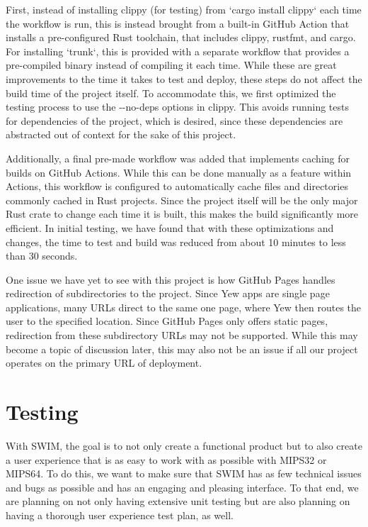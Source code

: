 \documentclass[
    paper=letter,
    parskip=half,
    fontsize=12pt,
    titlepage=firstiscover,
    toc=bibliography,
    numbers=endperiod
]{scrartcl}
\let\oldsection\section
\renewcommand{\section}{\newpage\oldsection}
\begin{document}
First, instead of installing clippy (for testing) from `cargo install
clippy` each time the workflow is run, this is instead brought from a
built-in GitHub Action \cite{ga-rust-toolchain} that installs a pre-configured Rust toolchain,
that includes clippy, rustfmt, and cargo. For installing `trunk`, this
is provided with a separate workflow \cite{ga-trunk} that provides a pre-compiled binary
instead of compiling it each time. While these are great improvements to
the time it takes to test and deploy, these steps do not affect the
build time of the project itself. To accommodate this, we first
optimized the testing process to use the -\/-no-deps options in clippy.
This avoids running tests for dependencies of the project, which is
desired, since these dependencies are abstracted out of context for the
sake of this project.

Additionally, a final pre-made workflow \cite{ga-rust-cache} was added that implements
caching for builds on GitHub Actions. While this can be done manually as
a feature within Actions, this workflow is configured to automatically
cache files and directories commonly cached in Rust projects. Since the
project itself will be the only major Rust crate to change each time it
is built, this makes the build significantly more efficient. In initial
testing, we have found that with these optimizations and changes, the
time to test and build was reduced from about 10 minutes to less than 30
seconds.

One issue we have yet to see with this project is how GitHub Pages
handles redirection of subdirectories to the project. Since Yew apps are
single page applications, many URLs direct to the same one page, where
Yew then routes the user to the specified location. Since GitHub Pages
only offers static pages, redirection from these subdirectory URLs may
not be supported. While this may become a topic of discussion later,
this may also not be an issue if all our project operates on the primary
URL of deployment.


\section{Testing}

With SWIM, the goal is to not only create a functional product but to also create a user experience that is as easy to work with as possible with MIPS32 or MIPS64.
To do this, we want to make sure that SWIM has as few technical issues
and bugs as possible and has an engaging and pleasing interface. To that
end, we are planning on not only having extensive unit testing but are
also planning on having a thorough user experience test plan, as well.
\end{document}
